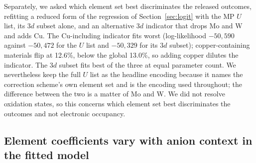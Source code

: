 \documentclass[11pt]{article}
\begin{document}
Separately, we asked which element set best discriminates the released outcomes, refitting a reduced form of the
regression of Section~\ref{sec:logit} with the MP $U$ list, its 3$d$ subset alone, and
an alternative 3$d$ indicator that drops Mo and W and adds Cu. The Cu-including
indicator fits worst (log-likelihood $-50{,}590$ against $-50{,}472$ for the $U$ list
and $-50{,}329$ for its 3$d$ subset); copper-containing materials flip at 12.6\%, below
the global 13.0\%, so adding copper dilutes the indicator. The 3$d$ subset fits best of
the three at equal parameter count. We nevertheless keep the full $U$ list as the
headline encoding because it names the correction scheme's own element set and is the
encoding used throughout; the difference between the two is a
matter of Mo and W. We did not resolve oxidation
states, so this concerns which element set best discriminates the outcomes and not electronic
occupancy.

\subsection{Element coefficients vary with anion context in the fitted model}\label{sec:additivity}
\end{document}
